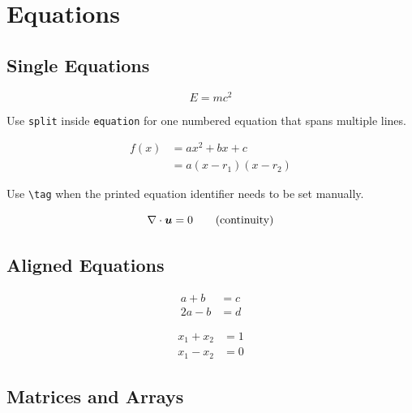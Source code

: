 \chapter{Equations}
\label{ch:equations}

\section{Single Equations}
\label{sec:equations-single}

\begin{equation}
	\label{eq:equations-basic}
	E = mc^2
\end{equation}

Use \texttt{split} inside \texttt{equation} for one numbered equation that spans
multiple lines.

\begin{equation}
	\label{eq:equations-multiline}
	\begin{split}
		f(x) &= ax^2 + bx + c \\
		     &= a(x-r_1)(x-r_2)
	\end{split}
\end{equation}

Use \verb|\tag| when the printed equation identifier needs to be set manually.

\begin{equation*}
	\nabla \cdot \boldsymbol{u} = 0
	\tag{continuity}
	\label{eq:equations-continuity}
\end{equation*}

\section{Aligned Equations}
\label{sec:equations-aligned}

\begin{align}
	\label{eq:equations-align-first}
	a + b &= c \\
	\label{eq:equations-align-second}
	2a - b &= d
\end{align}

\begin{subequations}
	\label{eq:equations-subequations}
	\begin{align}
		\label{eq:equations-subequations-a}
		x_1 + x_2 &= 1 \\
		\label{eq:equations-subequations-b}
		x_1 - x_2 &= 0
	\end{align}
\end{subequations}

\section{Matrices and Arrays}
\label{sec:equations-matrices}

